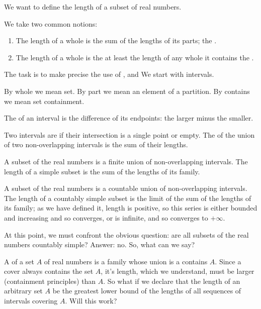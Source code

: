 

We want to define the length
of a subset of real numbers.


We take two common notions:

\begin{enumerate}

  \item
  The length of a whole
  is the sum of the lengths
  of its parts;
  the .

  \item
  The length of a whole
  is the at least the length
  of any whole it contains
  the .

\end{enumerate}

The task is to make precise
the use of
,
and 
We start with intervals.


By whole we mean set.
By part we mean an element
of a partition.
By contains we mean set
containment.

The
of an interval is the difference
of its endpoints: the larger minus
the smaller.

Two intervals are
if their intersection
is a single point or empty.
The  of the union of
two non-overlapping intervals is
the sum of their lengths.

A  subset
of the real numbers
is a finite union
of non-overlapping intervals.
The length of a simple subset
is the sum of the lengths of
its family.

A  subset
of the real numbers
is a countable union
of non-overlapping intervals.
The length of a countably simple subset
is the limit of the sum of the lengths
of its family; as we have defined it,
length is positive, so this series is either
bounded and increasing and so converges, or is
infinite, and so converges to $+\infty$.

At this point, we must confront the obvious
question: are all subsets of the real numbers
countably simple?
Answer: no.
So, what can we say?

A 
of a set $A$ of real numbers
is a family whose union
is a contains $A$.
Since a cover always contains
the set $A$, it's length, which
we understand, must be larger
(containment principles) than
$A$.
So what if we declare that
the length of an arbitrary set
$A$ be the greatest lower bound
of the lengths of all sequences
of intervals covering $A$.
Will this work?

